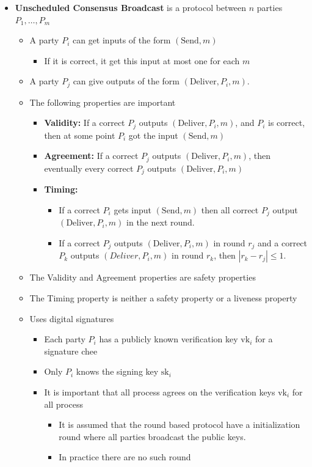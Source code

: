 \documentclass[11pt]{article}
\begin{document}
\begin{itemize}
\item \textbf{Unscheduled Consensus Broadcast} is a protocol between \(n\) parties \(P_1, \dots, P_m\)
\begin{itemize}
\item A party \(P_i\) can get inputs of the form \((\text{Send},m)\)
\begin{itemize}
\item If it is correct, it get this input at most one for each \(m\)
\end{itemize}
\item A party \(P_j\) can give outputs of the form \((\text{Deliver},P_i,m)\).
\item The following properties are important
\begin{itemize}
\item \textbf{Validity:} If a correct \(P_j\) outputs \((\text{Deliver},P_i,m)\), and \(P_i\) is correct, then at some point \(P_i\) got the input \((\text{Send},m)\)
\item \textbf{Agreement:} If a correct \(P_j\) outputs \((\text{Deliver},P_i,m)\), then eventually every correct \(P_j\) outputs \((\text{Deliver},P_i,m)\)
\item \textbf{Timing:}
\begin{itemize}
\item If a correct \(P_i\) gets input \((\text{Send},m)\) then all correct \(P_j\) output \((\text{Deliver}, P_i,m)\) in the next round.
\item If a correct \(P_j\) outputs \((\text{Deliver}, P_i, m)\) in round \(r_j\) and a correct \(P_k\) outputs \((Deliver, P_i, m)\) in round \(r_k\), then \(|r_k-r_j| \leq 1\).
\end{itemize}
\end{itemize}
\item The Validity and Agreement properties are safety properties
\item The Timing property is neither a safety property or a liveness property
\item Uses digital signatures
\begin{itemize}
\item Each party \(P_i\) has a publicly known verification key \(\text{vk}_i\) for a signature chee
\item Only \(P_i\) knows the signing key \(\text{sk}_i\)
\item It is important that all process agrees on the verification keys \(\text{vk}_i\) for all process
\begin{itemize}
\item It is assumed that the round based protocol have a initialization round where all parties broadcast the public keys.
\item In practice there are no such round
\end{itemize}
\end{itemize}
\end{itemize}


\end{itemize}
\end{document}
